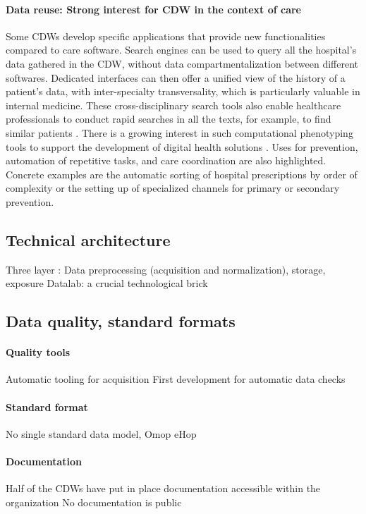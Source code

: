 \documentclass{report}
\begin{document}
\paragraph{Data reuse: Strong interest for CDW in the context of care}

Some CDWs develop specific applications that provide new functionalities
compared to care software. Search engines can be used to query all the
hospital's data gathered in the CDW, without data compartmentalization between
different softwares. Dedicated interfaces can then offer a unified view of the
history of a patient's data, with inter-specialty transversality, which is
particularly valuable in internal medicine. These cross-disciplinary search
tools also enable healthcare professionals to conduct rapid searches in all the
texts, for example, to find similar patients \citep{garcelon2017finding}.
%
There is a growing interest in such computational phenotyping tools to support
the development of digital health solutions \citep{wen2023impact}.
%
Uses for prevention, automation of repetitive tasks, and care coordination are
also highlighted. Concrete examples are the automatic sorting of hospital
prescriptions by order of complexity or the setting up of specialized channels
for primary or secondary prevention.


\subsection{Technical architecture}\label{subsec:cdw:results:architecture}
Three layer : Data preprocessing (acquisition and normalization), storage, exposure
Datalab: a crucial technological brick

\subsection{Data quality, standard formats}\label{subsec:cdw:results:data_quality}
\paragraph{Quality tools}
Automatic tooling for acquisition
First development for automatic data checks
\paragraph{Standard format}
No single standard data model,
Omop
eHop
\paragraph{Documentation}
Half of the CDWs have put in place documentation accessible within the organization
No documentation is public
\end{document}
